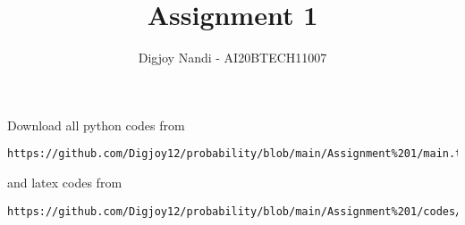 \documentclass[journal,12pt,twocolumn]{IEEEtran}
\DeclareMathOperator*{\Res}{Res}
\begin{document}
\newcommand{\BEQA}{\begin{eqnarray}}
\newcommand{\EEQA}{\end{eqnarray}}
\newcommand{\define}{\stackrel{\triangle}{=}}

\raggedbottom
\setlength{\parindent}{0pt}
\providecommand{\mbf}{\mathbf}
\providecommand{\pr}[1]{\ensuremath{\Pr\left(#1\right)}}
\providecommand{\qfunc}[1]{\ensuremath{Q\left(#1\right)}}
\providecommand{\sbrak}[1]{\ensuremath{{}\left[#1\right]}}
\providecommand{\lsbrak}[1]{\ensuremath{{}\left[#1\right.}}
\providecommand{\rsbrak}[1]{\ensuremath{{}\left.#1\right]}}
\providecommand{\brak}[1]{\ensuremath{\left(#1\right)}}
\providecommand{\lbrak}[1]{\ensuremath{\left(#1\right.}}
\providecommand{\rbrak}[1]{\ensuremath{\left.#1\right)}}
\providecommand{\cbrak}[1]{\ensuremath{\left\{#1\right\}}}
\providecommand{\lcbrak}[1]{\ensuremath{\left\{#1\right.}}
\providecommand{\rcbrak}[1]{\ensuremath{\left.#1\right\}}}
\theoremstyle{remark}
\newtheorem{rem}{Remark}
\newcommand{\sgn}{\mathop{\mathrm{sgn}}}
\providecommand{\abs}[1]{\vert#1\vert}
\providecommand{\res}[1]{\Res\displaylimits_{#1}} 
\providecommand{\norm}[1]{\lVert#1\rVert}
\providecommand{\mtx}[1]{\mathbf{#1}}
\providecommand{\mean}[1]{E[ #1 ]}
\providecommand{\fourier}{\overset{\mathcal{F}}{ \rightleftharpoons}}
\providecommand{\system}{\overset{\mathcal{H}}{ \longleftrightarrow}}
\newcommand{\solution}{\noindent \textbf{Solution: }}
\newcommand{\cosec}{\,\text{cosec}\,}
\providecommand{\dec}[2]{\ensuremath{\overset{#1}{\underset{#2}{\gtrless}}}}
\newcommand{\myvec}[1]{\ensuremath{\begin{pmatrix}#1\end{pmatrix}}}
\newcommand{\mydet}[1]{\ensuremath{\begin{vmatrix}#1\end{vmatrix}}}
\makeatletter
{}
\makeatother
\let\StandardTheFigure\thefigure
\let\vec\mathbf
\renewcommand{\thefigure}{\theproblem}
\def\putbox#1#2#3{\makebox[0in][l]{\makebox[#1][l]{}\raisebox{\baselineskip}[0in][0in]{\raisebox{#2}[0in][0in]{#3}}}}
     \def\rightbox#1{\makebox[0in][r]{#1}}
     \def\centbox#1{\makebox[0in]{#1}}
     \def\topbox#1{\raisebox{-\baselineskip}[0in][0in]{#1}}
     \def\midbox#1{\raisebox{-0.5\baselineskip}[0in][0in]{#1}}
\vspace{3cm}
\title{Assignment 1}
\author{Digjoy Nandi - AI20BTECH11007}
\maketitle
\newpage
\bigskip
\renewcommand{\thefigure}{\theenumi}
\renewcommand{\thetable}{\theenumi}
Download all python codes from 
\begin{lstlisting}
https://github.com/Digjoy12/probability/blob/main/Assignment%201/main.tex
\end{lstlisting}
%
and latex codes from 
%
\begin{lstlisting}
https://github.com/Digjoy12/probability/blob/main/Assignment%201/codes/code.py.py
\end{lstlisting}
\end{document}
